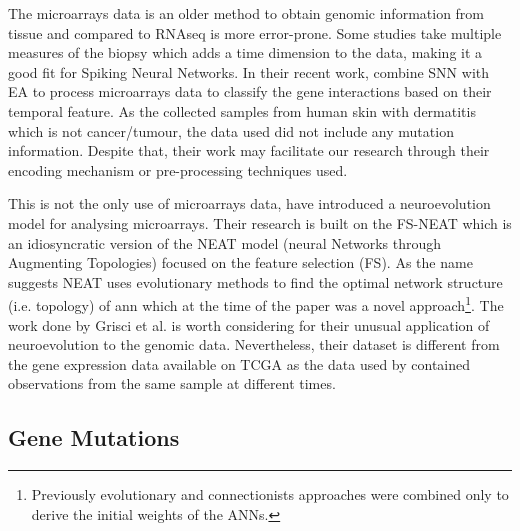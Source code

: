 The microarrays data is an older method to obtain genomic information from tissue and compared to RNAseq is more error-prone. Some studies take multiple measures of the biopsy which adds a time dimension to the data, making it a good fit for Spiking Neural Networks. In their recent work, \citet{Capecci2020-uj} combine SNN with EA to process microarrays data to classify the gene interactions based on their temporal feature. As the collected samples from human skin with dermatitis which is not cancer/tumour, the data used did not include any mutation information. Despite that, their work may facilitate our research through their encoding mechanism or pre-processing techniques used.

This is not the only use of microarrays data, \citet{Grisci2019-xn} have introduced a neuroevolution model for analysing microarrays. Their research is built on the FS-NEAT\cite{Whiteson2005-dn} which is an idiosyncratic version of the NEAT model (neural Networks through Augmenting Topologies)\cite{Stanley2002-tg} focused on the feature selection (FS). As the name suggests NEAT\cite{Stanley2002-tg} uses evolutionary methods to find the optimal network structure (i.e. topology) of \acrshort{ann} which at the time of the paper was a novel approach\footnote{Previously evolutionary and connectionists approaches were combined only to derive the initial weights of the ANNs.}. The work done by Grisci et al. is worth considering for their unusual application of neuroevolution to the genomic data. Nevertheless, their dataset is different from the gene expression data available on TCGA as the data used by \citet{Grisci2019-xn} contained observations from the same sample at different times.



\subsection{Gene Mutations} \label{s:mutations}

